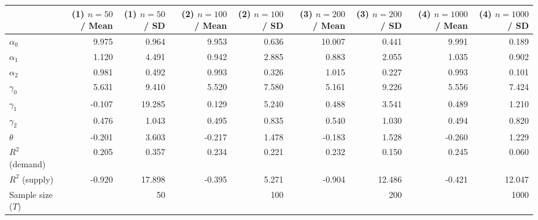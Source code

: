 
\begin{tabular}[t]{lrrrrrrrr}
\toprule
  & (1) $n=50$ / Mean & (1) $n=50$ / SD & (2) $n=100$ / Mean & (2) $n=100$ / SD & (3) $n=200$ / Mean & (3) $n=200$ / SD & (4) $n=1000$ / Mean & (4) $n=1000$ / SD\\
\midrule
$\alpha_{0}$ & 9.975 & 0.964 & 9.953 & 0.636 & 10.007 & 0.441 & 9.991 & 0.189\\
$\alpha_{1}$ & 1.120 & 4.491 & 0.942 & 2.885 & 0.883 & 2.055 & 1.035 & 0.902\\
$\alpha_{2}$ & 0.981 & 0.492 & 0.993 & 0.326 & 1.015 & 0.227 & 0.993 & 0.101\\
$\gamma_{0}$ & 5.631 & 9.410 & 5.520 & 7.580 & 5.161 & 9.226 & 5.556 & 7.424\\
$\gamma_{1}$ & -0.107 & 19.285 & 0.129 & 5.240 & 0.488 & 3.541 & 0.489 & 1.210\\
$\gamma_{2}$ & 0.476 & 1.043 & 0.495 & 0.835 & 0.540 & 1.030 & 0.494 & 0.820\\
$\theta$ & -0.201 & 3.603 & -0.217 & 1.478 & -0.183 & 1.528 & -0.260 & 1.229\\
$R^{2}$ (demand) & 0.205 & 0.357 & 0.234 & 0.221 & 0.232 & 0.150 & 0.245 & 0.060\\
$R^{2}$ (supply) & -0.920 & 17.898 & -0.395 & 5.271 & -0.904 & 12.486 & -0.421 & 12.047\\
Sample size ($T$) &  & 50 &  & 100 &  & 200 &  & 1000\\
\bottomrule
\end{tabular}
